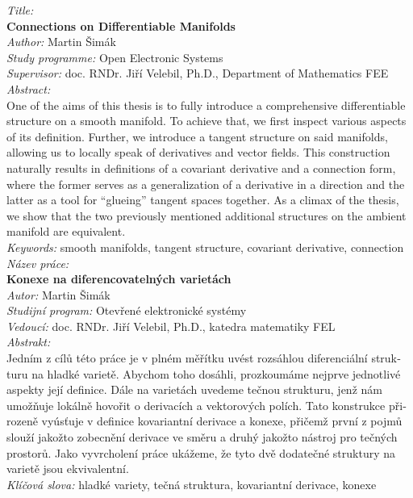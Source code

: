 \clearpage
\noindent\textit{Title:}\\
\textbf{Connections on Differentiable Manifolds}\\[0.25cm]
\textit{Author:} Martin Šimák\\[0.25cm]
\textit{Study programme:} Open Electronic Systems\\[0.25cm]
\textit{Supervisor:} doc. RNDr. Jiří Velebil, Ph.D., Department of Mathematics FEE\\[0.25cm]
\textit{Abstract:}\\
One of the aims of this thesis is to fully introduce a comprehensive differentiable structure on a smooth manifold. To achieve that, we first inspect various aspects of its definition. Further, we introduce a tangent structure on said manifolds, allowing us to locally speak of derivatives and vector fields. This construction naturally results in definitions of a covariant derivative and a connection form, where the former serves as a generalization of a derivative in a direction and the latter as a tool for ``glueing'' tangent spaces together. As a climax of the thesis, we show that the two previously mentioned additional structures on the ambient manifold are equivalent.\\[0.25cm]
\textit{Keywords:} smooth manifolds, tangent structure, covariant derivative, connection\\[0.5cm]
\noindent\textit{Název práce:}\\
\textbf{Konexe na diferencovatelných varietách}\\[0.25cm]
\textit{Autor:} Martin Šimák\\[0.25cm]
\textit{Studijní program:} Otevřené elektronické systémy\\[0.25cm]
\textit{Vedoucí:} doc. RNDr. Jiří Velebil, Ph.D., katedra matematiky FEL\\[0.25cm]
\textit{Abstrakt:}\\
\foreignlanguage{czech}{Jedním z cílů této práce je v plném měřítku uvést rozsáhlou diferenciální strukturu na hladké varietě. Abychom toho dosáhli, prozkoumáme nejprve jednotlivé aspekty její definice. Dále na varietách uvedeme tečnou strukturu, jenž nám umožňuje lokálně hovořit o derivacích a vektorových polích. Tato konstrukce přirozeně vyúsťuje v definice kovariantní derivace a konexe, přičemž první z pojmů slouží jakožto zobecnění derivace ve směru a druhý jakožto nástroj pro  tečných prostorů. Jako vyvrcholení práce ukážeme, že tyto dvě dodatečné struktury na varietě jsou ekvivalentní.}\\[0.25cm]
\textit{Klíčová slova:} hladké variety, tečná struktura, kovariantní derivace, konexe\\[0.5cm]
\clearpage